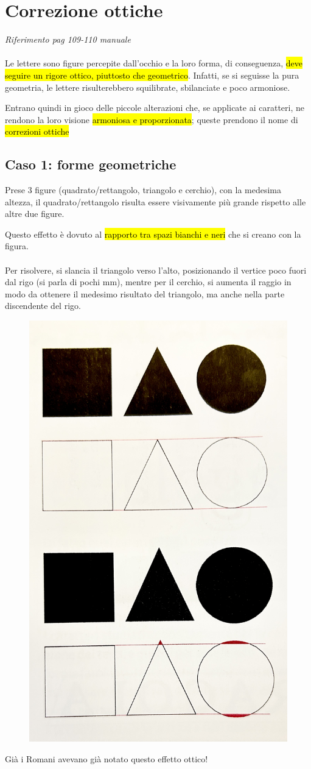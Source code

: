 \chapter{Correzione ottiche}
\textit{Riferimento pag 109-110 manuale}
\\\\
Le lettere sono figure percepite dall'occhio e la loro forma, di conseguenza, \hl{deve seguire un rigore ottico, piuttosto che geometrico}. Infatti, se si seguisse la pura geometria, le lettere risulterebbero squilibrate, sbilanciate e poco armoniose.

Entrano quindi in gioco delle piccole alterazioni che, se applicate ai caratteri, ne rendono la loro visione \hl{armoniosa e proporzionata}; queste prendono il nome di \hl{correzioni ottiche}

\section{Caso 1: forme geometriche}
Prese 3 figure (quadrato/rettangolo, triangolo e cerchio), con la medesima altezza, il quadrato/rettangolo risulta essere visivamente più grande rispetto alle altre due figure.

Questo effetto è dovuto al \hl{rapporto tra spazi bianchi e neri} che si creano con la figura.
\\\\
Per risolvere, si slancia il triangolo verso l'alto, posizionando il vertice poco fuori dal rigo (si parla di pochi mm), mentre per il cerchio, si aumenta il raggio in modo da ottenere il medesimo risultato del triangolo, ma anche nella parte discendente del rigo.
\begin{figure}[H]
    \centering
    \includegraphics[width=0.3\linewidth]{lezione_2 - correzioni ottiche/imgs/IMG_4754.jpg}
\end{figure}
\begin{mdframed}[style=mystyle,frametitle=Curiosità]
Già i Romani avevano già notato questo effetto ottico! 
\end{mdframed}

